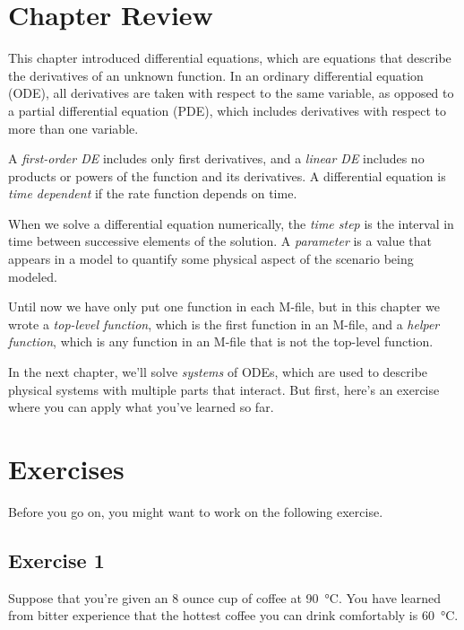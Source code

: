 \section{Chapter Review}

This chapter introduced differential equations, which are equations that describe the
derivatives of an unknown function.
In an ordinary differential equation (ODE), all derivatives are taken with
respect to the same variable, as opposed to a partial differential equation (PDE), which includes derivatives with respect to more than one variable.

A \emph{first-order DE} includes only first derivatives, and a \emph{linear DE} includes no products or powers of the function and its derivatives.
A differential equation is \emph{time dependent} if the rate function depends on time.

When we solve a differential equation numerically, the \emph{time step} is the interval in time between successive elements of the solution.
A \emph{parameter} is a value that appears in a model to quantify some
physical aspect of the scenario being modeled.

Until now we have only put one function in each M-file, but in this chapter we wrote a \emph{top-level function}, which is the first function in an M-file, and a \emph{helper function}, which is any function in an M-file that is not the top-level function.

In the next chapter, we'll solve \emph{systems} of ODEs, which are used to describe physical systems with multiple parts that interact.
But first, here's an exercise where you can apply what you've learned so far.


\section{Exercises}

Before you go on, you might want to work on the following exercise.

\subsection{Exercise 1}


Suppose that you're given an 8 ounce cup of coffee at \SI{90}{\celsius}.
You have learned from bitter experience that the hottest coffee you
can drink comfortably is \SI{60}{\celsius}.  

